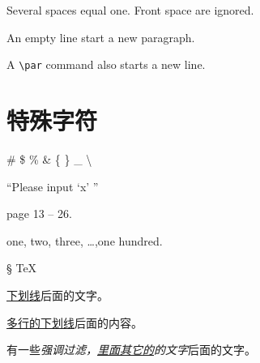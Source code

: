 \documentclass[UTF8]{ctexart}
\begin{document}
Several spaces   equal one.
   Front space are ignored.
   
   An empty line start a new paragraph. \par
   
   A \verb|\par| command also
   starts a new line.
   
 \section{特殊字符}
 \# \$ \% \&  \{ \} \_ \textbackslash
 
 ``Please input `x' ''
 
 page 13 -- 26.
 
 one, two, three, \ldots ,one hundred.
 
 \S{}
 \TeX
 
 \underline{下划线}后面的文字。
 
 \uline{多行的下划线}后面的内容。
 
 有一些\emph{强调\emph{过滤}，\uline{里面其它的}的文字}后面的文字。
\end{document}
